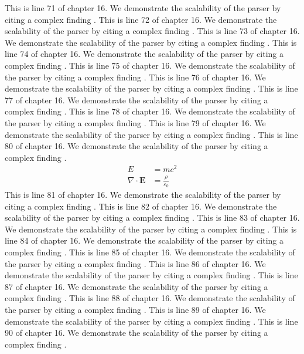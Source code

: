This is line 71 of chapter 16. We demonstrate the scalability of the parser by citing a complex finding \cite{ref16_71}.
This is line 72 of chapter 16. We demonstrate the scalability of the parser by citing a complex finding \cite{ref16_72}.
This is line 73 of chapter 16. We demonstrate the scalability of the parser by citing a complex finding \cite{ref16_73}.
This is line 74 of chapter 16. We demonstrate the scalability of the parser by citing a complex finding \cite{ref16_74}.
This is line 75 of chapter 16. We demonstrate the scalability of the parser by citing a complex finding \cite{ref16_75}.
This is line 76 of chapter 16. We demonstrate the scalability of the parser by citing a complex finding \cite{ref16_76}.
This is line 77 of chapter 16. We demonstrate the scalability of the parser by citing a complex finding \cite{ref16_77}.
This is line 78 of chapter 16. We demonstrate the scalability of the parser by citing a complex finding \cite{ref16_78}.
This is line 79 of chapter 16. We demonstrate the scalability of the parser by citing a complex finding \cite{ref16_79}.
This is line 80 of chapter 16. We demonstrate the scalability of the parser by citing a complex finding \cite{ref16_80}.
\begin{align*}
  E &= mc^2 \\
  \nabla \cdot \mathbf{E} &= \frac{\rho}{\varepsilon_0}
\end{align*}
This is line 81 of chapter 16. We demonstrate the scalability of the parser by citing a complex finding \cite{ref16_81}.
This is line 82 of chapter 16. We demonstrate the scalability of the parser by citing a complex finding \cite{ref16_82}.
This is line 83 of chapter 16. We demonstrate the scalability of the parser by citing a complex finding \cite{ref16_83}.
This is line 84 of chapter 16. We demonstrate the scalability of the parser by citing a complex finding \cite{ref16_84}.
This is line 85 of chapter 16. We demonstrate the scalability of the parser by citing a complex finding \cite{ref16_85}.
This is line 86 of chapter 16. We demonstrate the scalability of the parser by citing a complex finding \cite{ref16_86}.
This is line 87 of chapter 16. We demonstrate the scalability of the parser by citing a complex finding \cite{ref16_87}.
This is line 88 of chapter 16. We demonstrate the scalability of the parser by citing a complex finding \cite{ref16_88}.
This is line 89 of chapter 16. We demonstrate the scalability of the parser by citing a complex finding \cite{ref16_89}.
This is line 90 of chapter 16. We demonstrate the scalability of the parser by citing a complex finding \cite{ref16_90}.
